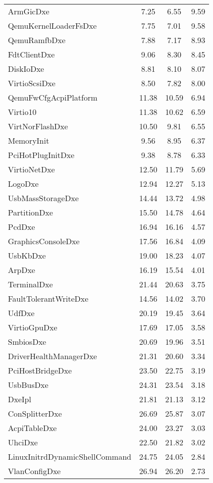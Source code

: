 \begin{longtable}{l c c c}
  ArmGicDxe & 7.25 & 6.55 & 9.59\\
  QemuKernelLoaderFsDxe & 7.75 & 7.01 & 9.58\\
  QemuRamfbDxe & 7.88 & 7.17 & 8.93\\
  FdtClientDxe & 9.06 & 8.30 & 8.45\\
  DiskIoDxe & 8.81 & 8.10 & 8.07\\
  VirtioScsiDxe & 8.50 & 7.82 & 8.00\\
  QemuFwCfgAcpiPlatform & 11.38 & 10.59 & 6.94\\
  Virtio10 & 11.38 & 10.62 & 6.59\\
  VirtNorFlashDxe & 10.50 & 9.81 & 6.55\\
  MemoryInit & 9.56 & 8.95 & 6.37\\
  PciHotPlugInitDxe & 9.38 & 8.78 & 6.33\\
  VirtioNetDxe & 12.50 & 11.79 & 5.69\\
  LogoDxe & 12.94 & 12.27 & 5.13\\
  UsbMassStorageDxe & 14.44 & 13.72 & 4.98\\
  PartitionDxe & 15.50 & 14.78 & 4.64\\
  PcdDxe & 16.94 & 16.16 & 4.57\\
  GraphicsConsoleDxe & 17.56 & 16.84 & 4.09\\
  UsbKbDxe & 19.00 & 18.23 & 4.07\\
  ArpDxe & 16.19 & 15.54 & 4.01\\
  TerminalDxe & 21.44 & 20.63 & 3.75\\
  FaultTolerantWriteDxe & 14.56 & 14.02 & 3.70\\
  UdfDxe & 20.19 & 19.45 & 3.64\\
  VirtioGpuDxe & 17.69 & 17.05 & 3.58\\
  SmbiosDxe & 20.69 & 19.96 & 3.51\\
  DriverHealthManagerDxe & 21.31 & 20.60 & 3.34\\
  PciHostBridgeDxe & 23.50 & 22.75 & 3.19\\
  UsbBusDxe & 24.31 & 23.54 & 3.18\\
  DxeIpl & 21.81 & 21.13 & 3.12\\
  ConSplitterDxe & 26.69 & 25.87 & 3.07\\
  AcpiTableDxe & 24.00 & 23.27 & 3.03\\
  UhciDxe & 22.50 & 21.82 & 3.02\\
  LinuxInitrdDynamicShellCommand & 24.75 & 24.05 & 2.84\\
  VlanConfigDxe & 26.94 & 26.20 & 2.73\\

\end{longtable}
